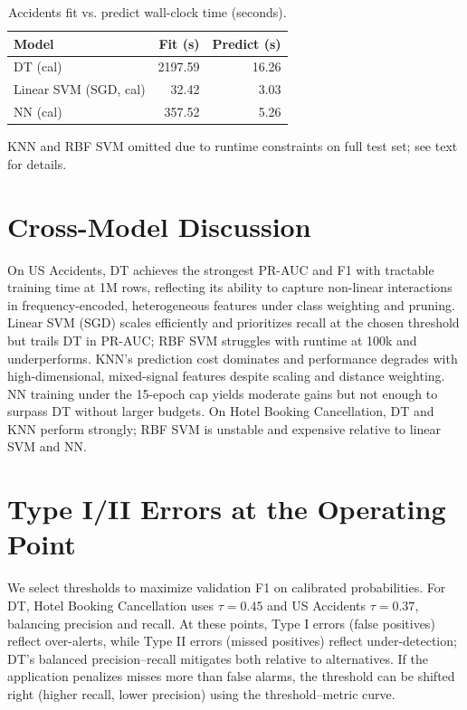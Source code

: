\documentclass[conference]{IEEEtran}
\newcommand{\datasetA}{Hotel Booking Cancellation}
\newcommand{\datasetB}{US Accidents}
\begin{document}
\begin{table}[htbp]
\caption{Accidents fit vs. predict wall-clock time (seconds).}
\begin{center}
\begin{tabular}{|l|r|r|}
\hline
Model & Fit (s) & Predict (s) \\
\hline
DT (cal) & 2197.59 & 16.26 \\
 Linear SVM (SGD, cal) & 32.42 & 3.03 \\
 NN (cal) & 357.52 & 5.26 \\
\hline
\end{tabular}
\end{center}
\vspace{2pt}\footnotesize KNN and RBF SVM omitted due to runtime constraints on full test set; see text for details.
\end{table}

\section{Cross-Model Discussion}
On \datasetB{}, DT achieves the strongest PR-AUC and F1 with tractable training time at 1M rows, reflecting its ability to capture non-linear interactions in frequency-encoded, heterogeneous features under class weighting and pruning. Linear SVM (SGD) scales efficiently and prioritizes recall at the chosen threshold but trails DT in PR-AUC; RBF SVM struggles with runtime at 100k and underperforms. KNN's prediction cost dominates and performance degrades with high-dimensional, mixed-signal features despite scaling and distance weighting. NN training under the 15-epoch cap yields moderate gains but not enough to surpass DT without larger budgets. On \datasetA{}, DT and KNN perform strongly; RBF SVM is unstable and expensive relative to linear SVM and NN.

\section{Type I/II Errors at the Operating Point}
We select thresholds to maximize validation F1 on calibrated probabilities. For DT, \datasetA{} uses $\tau\!=\!0.45$ and \datasetB{} $\tau\!=\!0.37$, balancing precision and recall. At these points, Type I errors (false positives) reflect over-alerts, while Type II errors (missed positives) reflect under-detection; DT's balanced precision–recall mitigates both relative to alternatives. If the application penalizes misses more than false alarms, the threshold can be shifted right (higher recall, lower precision) using the threshold–metric curve.
\end{document}
